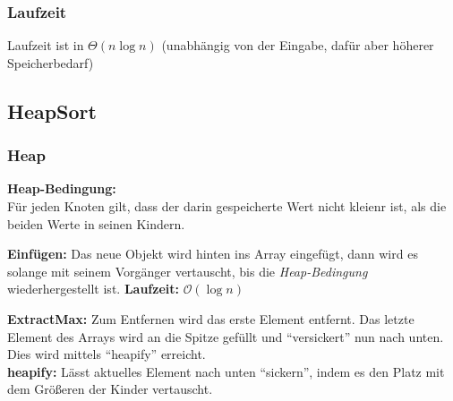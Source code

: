 \documentclass{scrartcl}
\begin{document}
\subsubsection{Laufzeit}
Laufzeit ist in $\Theta(n\log n)$ {\tiny (unabhängig von der Eingabe, dafür aber höherer Speicherbedarf)}

\subsection{HeapSort}
\subsubsection{Heap}
\begin{shaded}
\textbf{Heap-Bedingung:} \\ Für jeden Knoten gilt, dass der darin gespeicherte Wert nicht kleienr ist, als die beiden Werte in seinen Kindern.
\end{shaded}
\centerline{}

\textbf{Einfügen:} Das neue Objekt wird hinten ins Array eingefügt, dann wird es solange mit seinem Vorgänger vertauscht, bis die \emph{Heap-Bedingung} wiederhergestellt ist. \textbf{Laufzeit:} $\mathcal{O}(\log n)$

\textbf{ExtractMax:} Zum Entfernen wird das erste Element entfernt. Das letzte Element des Arrays wird an die Spitze gefüllt und "`versickert"' nun nach unten. Dies wird mittels "`heapify"' erreicht. \\

\textbf{heapify:} Lässt aktuelles Element nach unten "`sickern"', indem es den Platz mit dem Größeren der Kinder vertauscht.

\end{document}
